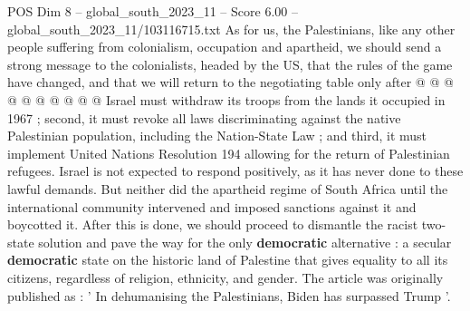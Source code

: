 \begin{textsample}{POS Dim 8 – global\_south\_2023\_11 – Score 6.00 – global\_south\_2023\_11/103116715.txt}
As for us, the Palestinians, like any other people suffering from colonialism, occupation and apartheid, we should send a strong message to the colonialists, headed by the US, that the rules of the game have changed, and that we will return to the negotiating table only after @ @ @ @ @ @ @ @ @ @ Israel must withdraw its troops from the lands it occupied in 1967 ; second, it must revoke all laws discriminating against the native Palestinian population, including the Nation-State Law ; and third, it must implement United Nations Resolution 194 allowing for the return of Palestinian refugees.
Israel is not expected to respond positively, as it has never done to these lawful demands.
But neither did the apartheid regime of South Africa until the international community intervened and imposed sanctions against it and boycotted it.
After this is done, we should proceed to dismantle the racist two-state solution and pave the way for the only \textbf{democratic} alternative : a secular \textbf{democratic} state on the historic land of Palestine that gives equality to all its citizens, regardless of religion, ethnicity, and gender.
The article was originally published as : ' In dehumanising the Palestinians, Biden has surpassed Trump '.

\end{textsample}
